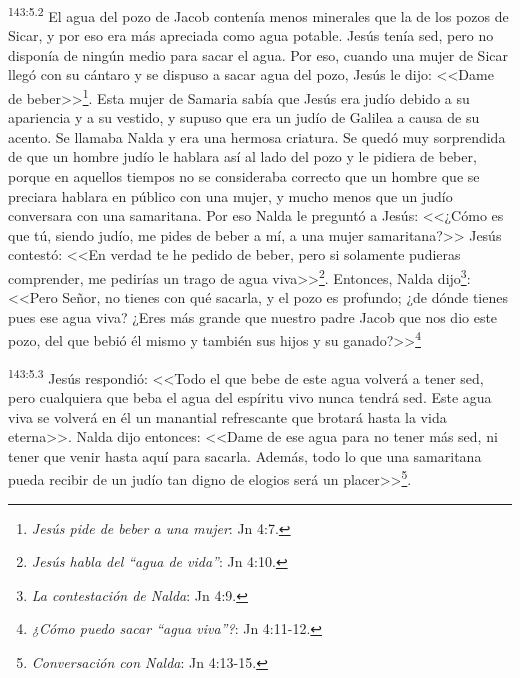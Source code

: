 \par 
\textsuperscript{143:5.2} El agua del pozo de Jacob contenía menos minerales que la de los pozos de Sicar, y por eso era más apreciada como agua potable. Jesús tenía sed, pero no disponía de ningún medio para sacar el agua. Por eso, cuando una mujer de Sicar llegó con su cántaro y se dispuso a sacar agua del pozo, Jesús le dijo: <<Dame de beber>>\footnote{\textit{Jesús pide de beber a una mujer}: Jn 4:7.}. Esta mujer de Samaria sabía que Jesús era judío debido a su apariencia y a su vestido, y supuso que era un judío de Galilea a causa de su acento. Se llamaba Nalda y era una hermosa criatura. Se quedó muy sorprendida de que un hombre judío le hablara así al lado del pozo y le pidiera de beber, porque en aquellos tiempos no se consideraba correcto que un hombre que se preciara hablara en público con una mujer, y mucho menos que un judío conversara con una samaritana. Por eso Nalda le preguntó a Jesús: <<¿Cómo es que tú, siendo judío, me pides de beber a mí, a una mujer samaritana?>> Jesús contestó: <<En verdad te he pedido de beber, pero si solamente pudieras comprender, me pedirías un trago de agua viva>>\footnote{\textit{Jesús habla del ``agua de vida''}: Jn 4:10.}. Entonces, Nalda dijo\footnote{\textit{La contestación de Nalda}: Jn 4:9.}: <<Pero Señor, no tienes con qué sacarla, y el pozo es profundo; ¿de dónde tienes pues ese agua viva? ¿Eres más grande que nuestro padre Jacob que nos dio este pozo, del que bebió él mismo y también sus hijos y su ganado?>>\footnote{\textit{¿Cómo puedo sacar ``agua viva''?}: Jn 4:11-12.}

\par 
\textsuperscript{143:5.3} Jesús respondió: <<Todo el que bebe de este agua volverá a tener sed, pero cualquiera que beba el agua del espíritu vivo nunca tendrá sed. Este agua viva se volverá en él un manantial refrescante que brotará hasta la vida eterna>>. Nalda dijo entonces: <<Dame de ese agua para no tener más sed, ni tener que venir hasta aquí para sacarla. Además, todo lo que una samaritana pueda recibir de un judío tan digno de elogios será un placer>>\footnote{\textit{Conversación con Nalda}: Jn 4:13-15.}.

